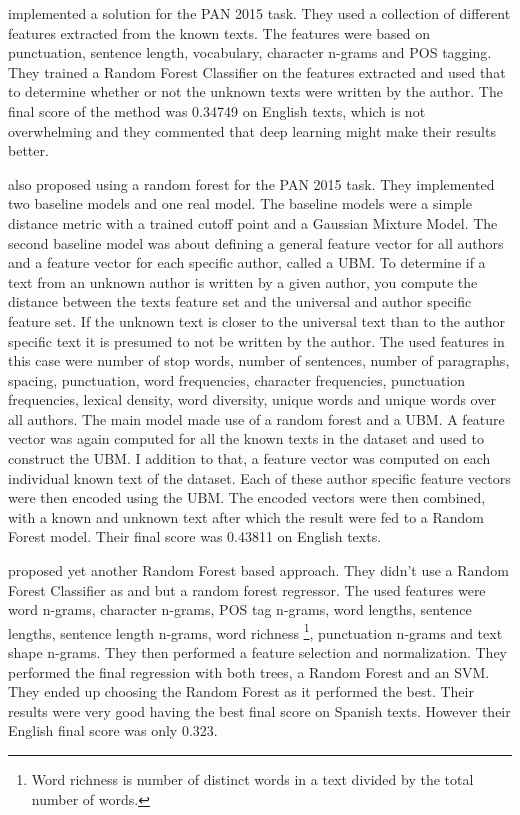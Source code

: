 \cite{maitra2015} implemented a solution for the PAN 2015 task. They used a
collection of different features extracted from the known texts. The features
were based on punctuation, sentence length, vocabulary, character n-grams and
\gls{POS} tagging. They trained a Random Forest Classifier on the features
extracted and used that to determine whether or not the unknown texts were
written by the author. The final score of the method was 0.34749 on English
texts, which is not overwhelming and they commented that deep learning might
make their results better.

\cite{pacheco2015} also proposed using a random forest for the PAN 2015 task.
They implemented two baseline models and one real model. The baseline models
were a simple distance metric with a trained cutoff point and a Gaussian Mixture
Model. The second baseline model was about defining a general feature vector for
all authors and a feature vector for each specific author, called a \gls{UBM}.
To determine if a text from an unknown author is written by a given author,
you compute the distance between the texts feature set and the universal and
author specific feature set. If the unknown text is closer to the universal
text than to the author specific text it is presumed to not be written by
the author. The used features in this case were number of stop words, number
of sentences, number of paragraphs, spacing, punctuation, word frequencies,
character frequencies, punctuation frequencies, lexical density, word diversity,
unique words and unique words over all authors. The main model made use of a
random forest and a \gls{UBM}. A feature vector was again computed for all the
known texts in the dataset and used to construct the \gls{UBM}. I addition
to that, a feature vector was computed on each individual known text of the
dataset. Each of these author specific feature vectors were then encoded using
the \gls{UBM}. The encoded vectors were then combined, with a known and unknown
text after which the result were fed to a Random Forest model. Their final score
was 0.43811 on English texts.

\cite{bartoli2015b} proposed yet another Random Forest based approach.
They didn't use a Random Forest Classifier as \cite{maitra2015} and
\cite{pacheco2015} but a random forest regressor. The used features were word
n-grams, character n-grams, \gls{POS} tag n-grams, word lengths, sentence
lengths, sentence length n-grams, word richness \footnote{Word richness is
number of distinct words in a text divided by the total number of words.},
punctuation n-grams and text shape n-grams. They then performed a feature
selection and normalization. They performed the final regression with both
trees, a Random Forest and an \gls{SVM}. They ended up choosing the Random
Forest as it performed the best. Their results were very good having the best
final score on Spanish texts. However their English final score was only 0.323.

